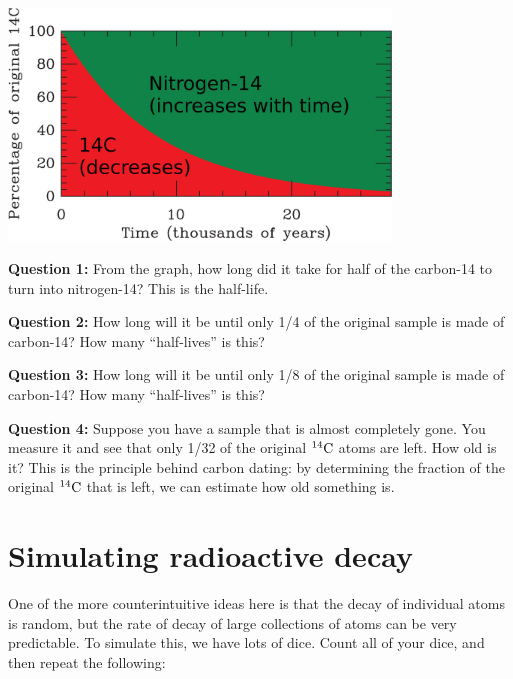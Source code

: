 \documentclass[11pt]{article}
\begin{document}
\begin{center}
\includegraphics[width=4in]{carbon-fraction-crop.png}
\end{center}

{\bf Question 1:} From the graph, how long did it take for half of the carbon-14 to turn into nitrogen-14? This is the half-life.

\vspace{1in}

{\bf Question 2:} How long will it be until only 1/4 of the original sample is made of carbon-14? How many ``half-lives'' is this?

\vspace{1in}

{\bf Question 3:} How long will it be until only 1/8 of the original sample is made of carbon-14? How many ``half-lives'' is this?

\vspace{1in}

{\bf Question 4:} Suppose you have a sample that is almost completely gone. You measure it and see that only 1/32 of the original
${}^{14}\rm C$ atoms are left. How old is it? This is the principle behind carbon dating: by determining the fraction of the original ${}^{14}\rm C$ that is left, we can estimate how old something is.

\vspace{1in}

\section{Simulating radioactive decay}

One of the more counterintuitive ideas here is that the decay of individual atoms is random, but the rate of decay of large collections
of atoms can be very predictable. To simulate this, we have lots of dice. Count all of your dice, and then repeat the following:
\end{document}
